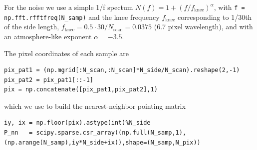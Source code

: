 \documentclass[twocolumn,apj]{aastex63}
\begin{document}
For the noise we use a simple 1/f spectum $N(f) = 1 + (f/f_\text{knee})^\alpha$,
with \lstinline{f = np.fft.rfftfreq(N_samp)}
and the knee frequency $f_\text{knee}$ corresponding to 1/30th of the side length,
$f_\text{knee} = 0.5\cdot 30/N_\text{scan} = 0.0375$ (6.7 pixel wavelength), and with
an atmosphere-like exponent $\alpha=-3.5$.

The pixel coordinates of each sample are
\begin{lstlisting}
pix_pat1 = (np.mgrid[:N_scan,:N_scan]*N_side/N_scan).reshape(2,-1)
pix_pat2 = pix_pat1[::-1]
pix = np.concatenate([pix_pat1,pix_pat2],1)
\end{lstlisting}
which we use to build the nearest-neighbor pointing matrix
\begin{lstlisting}
iy, ix = np.floor(pix).astype(int)%N_side
P_nn   = scipy.sparse.csr_array((np.full(N_samp,1),(np.arange(N_samp),iy*N_side+ix)),shape=(N_samp,N_pix))
\end{lstlisting}
\end{document}
